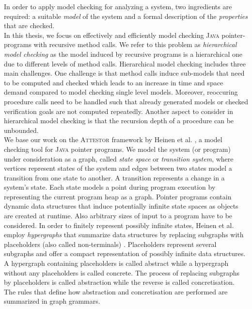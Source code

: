 \documentclass[a4paper, 12pt, twoside]{report}
\begin{document}
	In order to apply model checking for analyzing a system, two ingredients are required: a suitable \textit{model} of the system and a formal description of the \textit{properties} that are checked. \\
	
	In this thesis, we focus on effectively and efficiently model checking \textsc{Java} pointer-programs with recursive method calls. We refer to this problem as \textit{hierarchical model checking} as the model induced by recursive programs is a hierarchical one due to different levels of method calls. Hierarchical model checking includes three main challenges. One challenge is that method calls induce sub-models that need to be computed and checked which leads to an increase in time and space demand compared to model checking single level models. Moreover, reoccuring procedure calls need to be handled such that already generated models or checked verification goals are not computed repeatedly. Another aspect to consider in hierarchical model checking is that the recursion depth of a procedure can be unbounded.\\ 	
	
	We base our work on the \textsc{Attestor} framework by Heinen et al. \cite{heinen2015juggrnaut}, a model checking tool for \textsc{Java} pointer programs. We model the system (or program) under consideration as a graph, called \textit{state space} or \textit{transition system}, where vertices represent states of the system and edges between two states model a transition from one state to another. A transition represents a change in a system's state. Each state models a point during program execution by representing the current program heap as a graph. Pointer programs contain dynamic data structures that induce potentially infinite state spaces as objects are created at runtime. Also arbitrary sizes of input to a program have to be considered. In order to finitely represent possibly infinite states, Heinen et al. employ \textit{hypergraphs} that summarize data structures by replacing subgraphs with placeholders (also called non-terminals) \cite{heinen2015juggrnaut}. Placeholders represent several subgraphs and offer a compact representation of possibly infinite data structures. A hypergraph containing placeholders is called abstract while a hypergraph without any placeholders is called concrete. The process of replacing subgraphs by placeholders is called abstraction while the reverse is called concretisation. The rules that define how abstraction and concretisation are performed are summarized in graph grammars.\\
	
\end{document}
